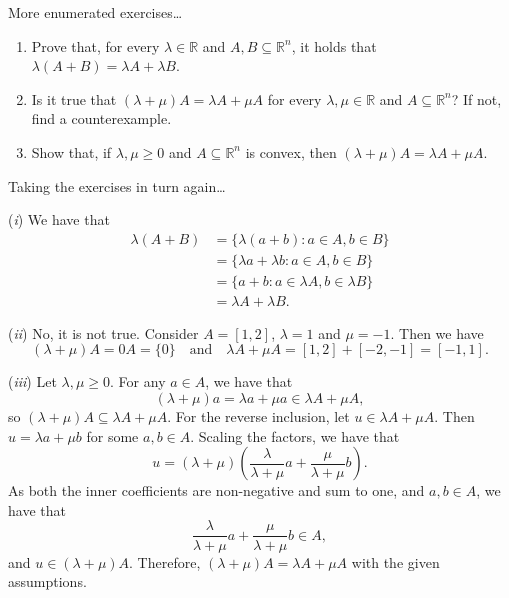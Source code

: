 \begin{exercise}
  More enumerated exercises\dots

  \begin{enumerate}[label = (\emph{\roman*})]
    \item Prove that, for every $\lambda \in \mathbb{R}$ and $A, B \subseteq \mathbb{R}^n$, it holds that $\lambda(A + B) = \lambda A + \lambda B$.

    \item Is it true that $(\lambda + \mu) A = \lambda A + \mu A$ for every $\lambda, \mu \in \mathbb{R}$ and $A \subseteq \mathbb{R}^n$?
      If not, find a counterexample.

    \item Show that, if $\lambda, \mu \geq 0$ and $A \subseteq \mathbb{R}^n$ is convex, then $(\lambda + \mu) A = \lambda A + \mu A$.
  \end{enumerate}
\end{exercise}

\begin{solution}
  Taking the exercises in turn again\dots

  (\emph{i}) We have that
  \begin{align*}
    \lambda (A + B) &= \{ \lambda (a + b) : a \in A, b \in B \} \\
    &= \{ \lambda a + \lambda b : a \in A, b \in B \} \\
    &= \{ a + b : a \in \lambda A, b \in \lambda B \} \\
    &= \lambda A + \lambda B.
  \end{align*}

  (\emph{ii}) No, it is not true.
  Consider $A = [1, 2]$, $\lambda = 1$ and $\mu = -1$.
  Then we have
  \begin{equation}
    (\lambda + \mu) A = 0A = \{ 0 \}
    \quad\text{and}\quad
    \lambda A + \mu A = [1, 2] + [-2, -1] = [-1, 1].
  \end{equation}

  (\emph{iii}) Let $\lambda, \mu \geq 0$.
  For any $a \in A$, we have that
  \begin{equation}
    (\lambda + \mu) a = \lambda a + \mu a \in \lambda A + \mu A,
  \end{equation}
  so $(\lambda + \mu) A \subseteq \lambda A + \mu A$.
  For the reverse inclusion, let $u \in \lambda A + \mu A$.
  Then $u = \lambda a + \mu b$ for some $a, b \in A$.
  Scaling the factors, we have that
  \begin{equation}
    u = (\lambda + \mu) \left(
      \frac{\lambda}{\lambda + \mu} a + \frac{\mu}{\lambda + \mu} b
    \right).
  \end{equation}
  As both the inner coefficients are non-negative and sum to one, and $a, b \in A$, we have that
  \begin{equation}
    \frac{\lambda}{\lambda + \mu} a + \frac{\mu}{\lambda + \mu} b \in A,
  \end{equation}
  and $u \in (\lambda + \mu) A$.
  Therefore, $(\lambda + \mu) A = \lambda A + \mu A$ with the given assumptions.
\end{solution}


